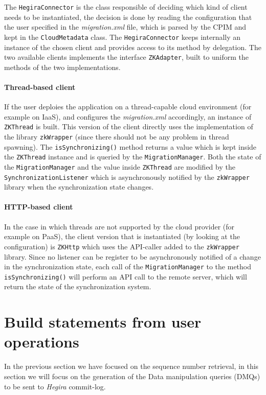 \noindent The \texttt{HegiraConnector} is the class responsible of deciding which kind of client needs to be instantiated, the decision is done by reading the configuration that the user specified in the \textit{migration.xml} file, which is parsed by the CPIM and kept in the \texttt{CloudMetadata} class. The \texttt{HegiraConnector}  keeps internally an instance of the chosen client and provides access to its method by delegation.
The two available clients implements the interface \texttt{ZKAdapter}, built to uniform the methods of the two implementations.

\paragraph{Thread-based client} If the user deploies the application on a thread-capable cloud environment (for example on IaaS), and configures the \textit{migration.xml} accordingly, an instance of \texttt{ZKThread} is built. This version of the client directly uses the implementation of the library \texttt{zkWrapper} (since there should not be any problem in thread spawning).
The \texttt{isSynchronizing()} method returns a value which is kept inside the \texttt{ZKThread} instance and is queried by the \texttt{MigrationManager}.
Both the state of the \texttt{MigrationManager} and the value inside \texttt{ZKThread} are modified by the \texttt{SynchronizationListener} which is asynchronously notified by the \texttt{zkWrapper} library when the synchronization state changes.

\paragraph{HTTP-based client} In the case in which threads are not supported by the cloud provider (for example on PaaS), the client version that is instantiated (by looking at the configuration) is \texttt{ZKHttp} which uses the API-caller added to the \texttt{zkWrapper} library.
Since no listener can be register to be asynchronously notified of a change in the synchronization state, each call of the \texttt{MigrationManager} to the method \texttt{isSynchronizing()} will perform an API call to the remote server, which will return the state of the synchronization system.

\section{Build statements from user operations}
\label{sec:statements}
In the previous section we have focused on the sequence number retrieval, in this section we will focus on the generation of the Data manipulation queries (DMQs) to be sent to \textit{Hegira} commit-log.

